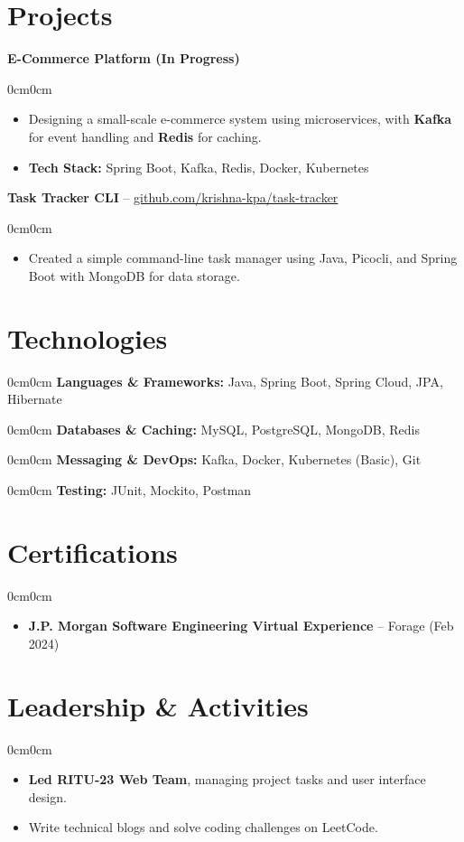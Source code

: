 \documentclass[10pt, letterpaper]{article}
\newenvironment{highlights}{
\begin{itemize}[topsep=0.08cm,parsep=0.08cm,partopsep=0pt,itemsep=0pt,leftmargin=10pt]}{\end{itemize}}
\newenvironment{onecolentry}{\begin{adjustwidth}{0cm}{0cm}}{\end{adjustwidth}}
\begin{document}
\section{Projects}
\vspace{0.05cm}
\textbf{E-Commerce Platform (In Progress)}
\begin{onecolentry}
\begin{highlights}
    \item Designing a small-scale e-commerce system using microservices, with \textbf{Kafka} for event handling and \textbf{Redis} for caching.
    \item \textbf{Tech Stack:} Spring Boot, Kafka, Redis, Docker, Kubernetes
\end{highlights}
\end{onecolentry}
\vspace{0.10cm}
\textbf{Task Tracker CLI} -- \href{https://github.com/krishna-kpa/task-tracker}{github.com/krishna-kpa/task-tracker}
\begin{onecolentry}
\begin{highlights}
    \item Created a simple command-line task manager using Java, Picocli, and Spring Boot with MongoDB for data storage.
\end{highlights}
\end{onecolentry}

\section{Technologies}
\begin{onecolentry}
\textbf{Languages \& Frameworks:} Java, Spring Boot, Spring Cloud, JPA, Hibernate
\end{onecolentry}
\begin{onecolentry}
\textbf{Databases \& Caching:} MySQL, PostgreSQL, MongoDB, Redis
\end{onecolentry}
\begin{onecolentry}
\textbf{Messaging \& DevOps:} Kafka, Docker, Kubernetes (Basic), Git
\end{onecolentry}
\begin{onecolentry}
\textbf{Testing:} JUnit, Mockito, Postman
\end{onecolentry}

\section{Certifications}
\begin{onecolentry}
\begin{highlights}
    \item \textbf{J.P. Morgan Software Engineering Virtual Experience} – Forage (Feb 2024)
\end{highlights}
\end{onecolentry}

\section{Leadership \& Activities}
\begin{onecolentry}
\begin{highlights}
    \item \textbf{Led RITU-23 Web Team}, managing project tasks and user interface design.
    \item Write technical blogs and solve coding challenges on LeetCode.
\end{highlights}
\end{onecolentry}
\end{document}
